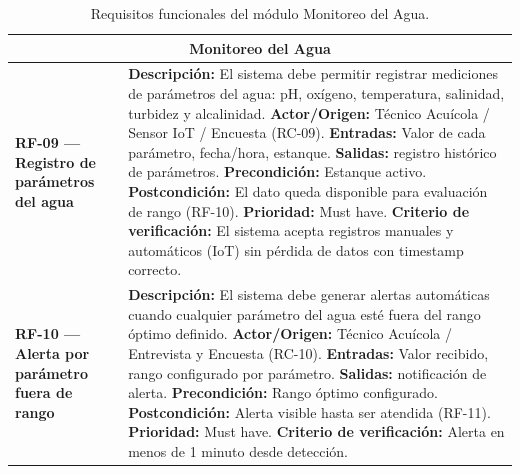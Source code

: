 \documentclass[11pt,a4paper]{article}
\begin{document}
\begin{longtable}{|p{3.5cm}|p{12cm}|}
\caption{Requisitos funcionales del módulo Monitoreo del Agua.}
\label{tab:rf-agua} \\
\hline
\multicolumn{2}{|c|}{\textbf{Monitoreo del Agua}} \\ \hline

\textbf{RF-09 — Registro de parámetros del agua} &
\textbf{Descripción:} El sistema debe permitir registrar mediciones de parámetros del agua: pH, oxígeno, temperatura, salinidad, turbidez y alcalinidad. \newline
\textbf{Actor/Origen:} Técnico Acuícola / Sensor IoT / Encuesta (RC-09). \newline
\textbf{Entradas:} Valor de cada parámetro, fecha/hora, estanque. \newline
\textbf{Salidas:} registro histórico de parámetros. \newline
\textbf{Precondición:} Estanque activo. \newline
\textbf{Postcondición:} El dato queda disponible para evaluación de rango (RF-10). \newline
\textbf{Prioridad:} Must have. \newline
\textbf{Criterio de verificación:} El sistema acepta registros manuales y automáticos (IoT) sin pérdida de datos con timestamp correcto. \\ \hline

\textbf{RF-10 — Alerta por parámetro fuera de rango} &
\textbf{Descripción:} El sistema debe generar alertas automáticas cuando cualquier parámetro del agua esté fuera del rango óptimo definido. \newline
\textbf{Actor/Origen:} Técnico Acuícola / Entrevista y Encuesta (RC-10). \newline
\textbf{Entradas:} Valor recibido, rango configurado por parámetro. \newline
\textbf{Salidas:} notificación de alerta. \newline
\textbf{Precondición:} Rango óptimo configurado. \newline
\textbf{Postcondición:} Alerta visible hasta ser atendida (RF-11). \newline
\textbf{Prioridad:} Must have. \newline
\textbf{Criterio de verificación:} Alerta en menos de 1 minuto desde detección. \\ \hline


\end{longtable}
\end{document}

